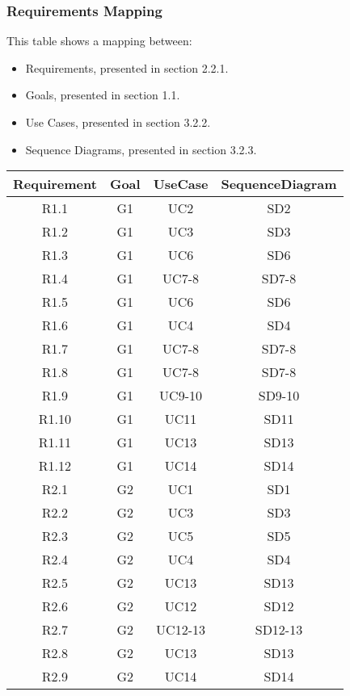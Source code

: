 \subsubsection{Requirements Mapping}

This table shows a mapping between:
\begin{itemize}
	\item Requirements, presented in section 2.2.1.
	\item Goals, presented in section 1.1.
	\item Use Cases, presented in section 3.2.2.
	\item Sequence Diagrams, presented in section 3.2.3.
\end{itemize}

	\setlength{\tabcolsep}{1cm}
\begin{longtable}[]{c c c c}
	\textbf{Requirement} & \textbf{Goal} & \textbf{UseCase} & \textbf{SequenceDiagram} \\
	\hline   
	\endhead
	R1.1 & G1 & UC2 & SD2 \\
	R1.2 & G1 & UC3 & SD3 \\
	R1.3 & G1 & UC6 & SD6 \\
	R1.4 & G1 & UC7-8 & SD7-8\\
	R1.5 & G1 & UC6 & SD6 \\
	R1.6 & G1 & UC4 & SD4 \\
	R1.7 & G1 & UC7-8 & SD7-8\\
	R1.8 & G1 & UC7-8 & SD7-8\\
	R1.9 & G1 & UC9-10 & SD9-10\\
	R1.10 & G1 & UC11 & SD11\\
	R1.11 & G1 & UC13 & SD13\\
	R1.12 & G1 & UC14 & SD14\\
	
	R2.1 & G2 & UC1 & SD1 \\
	R2.2 & G2 & UC3 & SD3 \\
	R2.3 & G2 & UC5 & SD5 \\
	R2.4 & G2 & UC4 & SD4 \\
	R2.5 & G2 & UC13 & SD13 \\
	R2.6 & G2 & UC12 & SD12 \\
	R2.7 & G2 & UC12-13 & SD12-13 \\
	R2.8 & G2 & UC13 & SD13 \\
	R2.9 & G2 & UC14 & SD14\\


\end{longtable}
